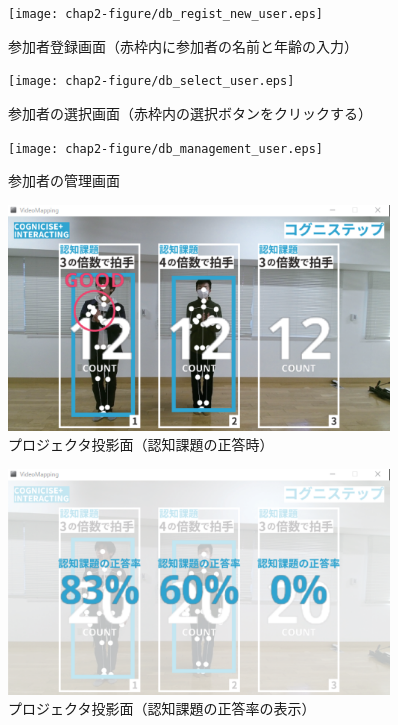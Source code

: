 \begin{figure}[tbp]
	\centering
			\texttt{[image: chap2-figure/db\_regist\_new\_user.eps]}
	\caption{参加者登録画面（赤枠内に参加者の名前と年齢の入力）}
	\label{fig:db_regist_new_user}
\end{figure}

\begin{figure}[tbp]
	\centering
			\texttt{[image: chap2-figure/db\_select\_user.eps]}
	\caption{参加者の選択画面（赤枠内の選択ボタンをクリックする）}
	\label{fig:db_select_user}
\end{figure}

\begin{figure}[tbp]
	\centering
			\texttt{[image: chap2-figure/db\_management\_user.eps]}
	\caption{参加者の管理画面}
	\label{fig:db_management_user}
\end{figure}
\fi


\begin{figure}[tbp]
	\centering
			\includegraphics[width=0.9\textwidth]{chap2-figure/vm_clap.eps}
	\caption{プロジェクタ投影面（認知課題の正答時）}
	\label{fig:vm_clap}
\end{figure}

\begin{figure}[tbp]
	\centering
			\includegraphics[width=0.9\textwidth]{chap2-figure/vm_answer_rate.eps}
	\caption{プロジェクタ投影面（認知課題の正答率の表示）}
	\label{fig:vm_answer_rate}
\end{figure}

